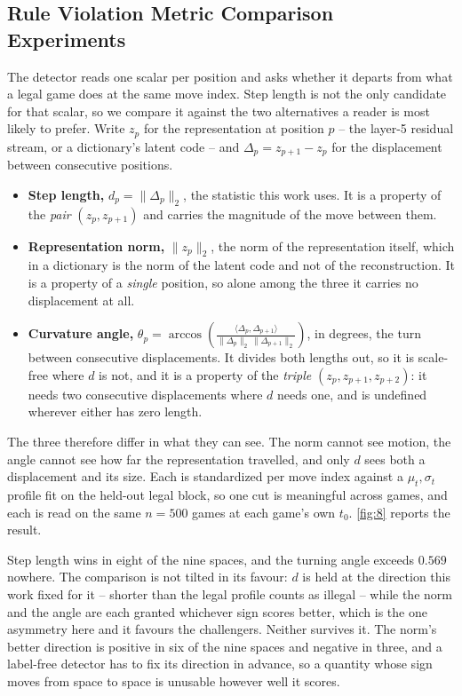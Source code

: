 \documentclass{article}
\begin{document}
\subsection{Rule Violation Metric Comparison Experiments}

The detector reads one scalar per position and asks whether it departs from what a legal game
does at the same move index. Step length is not the only candidate for that scalar, so we
compare it against the two alternatives a reader is most likely to prefer. Write $z_p$ for the
representation at position $p$ -- the layer-5 residual stream, or a dictionary's latent code --
and $\Delta_p = z_{p+1} - z_p$ for the displacement between consecutive positions.

\begin{itemize}
\item \textbf{Step length,} $d_p = \|\Delta_p\|_2$, the statistic this work uses. It is a property
of the \textit{pair} $(z_p, z_{p+1})$ and carries the magnitude of the move between them.

\item \textbf{Representation norm,} $\|z_p\|_2$, the norm of the representation itself, which in a
dictionary is the norm of the latent code and not of the reconstruction. It is a property of a
\textit{single} position, so alone among the three it carries no displacement at all.

\item \textbf{Curvature angle,} $\theta_p = \arccos\!\left(\frac{\langle \Delta_p, \Delta_{p+1}
\rangle}{\|\Delta_p\|_2\,\|\Delta_{p+1}\|_2}\right)$, in degrees, the turn between consecutive
displacements. It divides both lengths out, so it is scale-free where $d$ is not, and it is a
property of the \textit{triple} $(z_p, z_{p+1}, z_{p+2})$: it needs two consecutive
displacements where $d$ needs one, and is undefined wherever either has zero length.
\end{itemize}

The three therefore differ in what they can see. The norm cannot see motion, the angle cannot
see how far the representation travelled, and only $d$ sees both a displacement and its size.
Each is standardized per move index against a $\mu_t, \sigma_t$ profile fit on the held-out
legal block, so one cut is meaningful across games, and each is read on the same $n = 500$
games at each game's own $t_0$. \cref{fig:8} reports the result.

Step length wins in eight of the nine spaces, and the turning angle exceeds $0.569$ nowhere.
The comparison is not tilted in its favour: $d$ is held at the direction this work fixed for it
-- shorter than the legal profile counts as illegal -- while the norm and the angle are each
granted whichever sign scores better, which is the one asymmetry here and it favours the
challengers. Neither survives it. The norm's better direction is positive in six of the nine
spaces and negative in three, and a label-free detector has to fix its direction in advance, so
a quantity whose sign moves from space to space is unusable however well it scores.
\end{document}
